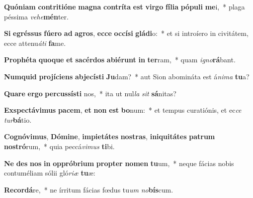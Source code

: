 \item \textbf{Quón}\textbf{i}\textbf{am} \textbf{con}\textbf{tri}\textbf{ti}\textbf{ó}\textbf{ne} \textbf{ma}\textbf{gna} \textbf{con}\textbf{trí}\textbf{ta} \textbf{est} \textbf{vir}\textbf{go} \textbf{fí}\textbf{li}\textbf{a} \textbf{pó}\textbf{pu}\textbf{li} \textbf{me}i,~* plaga péssima \textit{ve}\textit{he}\textbf{mén}ter.
\item \textbf{Si} \textbf{e}\textbf{grés}\textbf{sus} \textbf{fú}\textbf{e}\textbf{ro} \textbf{ad} \textbf{a}\textbf{gros}, \textbf{ec}\textbf{ce} \textbf{oc}\textbf{cí}\textbf{si} \textbf{glá}\textbf{di}o:~* et si introíero in civitátem, ecce attenu\textit{á}\textit{ti} \textbf{fa}me.
\item \textbf{Pro}\textbf{phé}\textbf{ta} \textbf{quo}\textbf{que} \textbf{et} \textbf{sa}\textbf{cér}\textbf{dos} \textbf{ab}\textbf{i}\textbf{é}\textbf{runt} \textbf{in} \textbf{ter}ram,~* quam \textit{i}\textit{gno}\textbf{rá}bant.
\item \textbf{Num}\textbf{quid} \textbf{pro}\textbf{jí}\textbf{ci}\textbf{ens} \textbf{ab}\textbf{je}\textbf{cís}\textbf{ti} \textbf{Ju}dam?~* aut Sion abomináta est á\textit{ni}\textit{ma} \textbf{tu}a?
\item \textbf{Qua}\textbf{re} \textbf{er}\textbf{go} \textbf{per}\textbf{cus}\textbf{sís}\textbf{ti} nos,~* ita ut nul\textit{la} \textit{sit} \textbf{sá}nitas?
\item \textbf{Ex}\textbf{spec}\textbf{tá}\textbf{vi}\textbf{mus} \textbf{pa}\textbf{cem}, \textbf{et} \textbf{non} \textbf{est} \textbf{bo}num:~* et tempus curatiónis, et ec\textit{ce} \textit{tur}\textbf{bá}tio.
\item \textbf{Co}\textbf{gnó}\textbf{vi}\textbf{mus}, \textbf{Dó}\textbf{mi}\textbf{ne}, \textbf{im}\textbf{pi}\textbf{e}\textbf{tá}\textbf{tes} \textbf{nos}\textbf{tras}, \textbf{in}\textbf{i}\textbf{qui}\textbf{tá}\textbf{tes} \textbf{pa}\textbf{trum} \textbf{nos}\textbf{tró}rum,~* quia peccá\textit{vi}\textit{mus} \textbf{ti}bi.
\item \textbf{Ne} \textbf{des} \textbf{nos} \textbf{in} \textbf{op}\textbf{pró}\textbf{bri}\textbf{um} \textbf{prop}\textbf{ter} \textbf{no}\textbf{men} \textbf{tu}um,~* neque fácias nobis contuméliam sólii gló\textit{ri}\textit{æ} \textbf{tu}æ:
\item \textbf{Re}\textbf{cor}\textbf{dá}re,~* ne írritum fácias fœdus tu\textit{um} \textit{no}\textbf{bís}cum.
